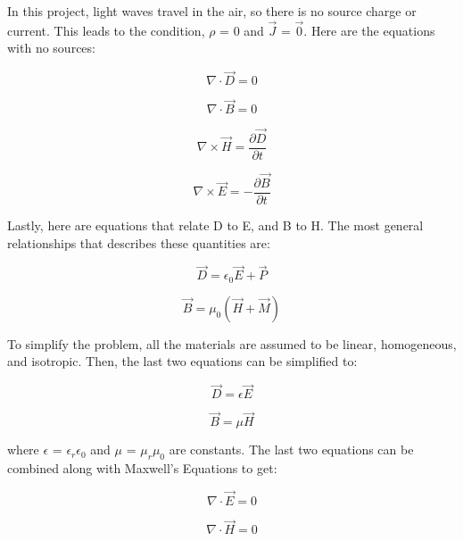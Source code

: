 \documentclass[12pt]{article}
\begin{document}
In this project, light waves travel in the air, so there is no source charge or current. This leads to the condition, \(\rho\) = 0 and \(\vec{J}\) = \(\vec{0}\). Here are the equations with no sources:

\begin{equation}
	\nabla \cdot \vec{D} = 0
\end{equation}

\begin{equation}
	\nabla \cdot \vec{B} = 0
\end{equation}

\begin{equation}
	\nabla \times \vec{H} = \frac{\partial \vec{D}}{\partial t}
\end{equation}

\begin{equation}
	\nabla \times \vec{E} = -\frac{\partial \vec{B}}{\partial t}
\end{equation}

Lastly, here are equations that relate D to E, and B to H. The most general relationships that describes these quantities are:

\begin{equation}
	\vec{D} = \epsilon_{0}\vec{E} + \vec{P}
\end{equation}

\begin{equation}
	\vec{B} = \mu_{0}(\vec{H} + \vec{M})
\end{equation}

To simplify the problem, all the materials are assumed to be linear, homogeneous, and isotropic. Then, the last two equations can be simplified to:

\begin{equation}
	\vec{D} = \epsilon\vec{E}
\end{equation}

\begin{equation}
	\vec{B} = \mu\vec{H}
\end{equation}

where \(\epsilon\) = \(\epsilon_{r}\)\(\epsilon_{0}\) and \(\mu\) = \(\mu_{r}\)\(\mu_{0}\) are constants. The last two equations can be combined along with Maxwell's Equations to get:

\begin{equation}
	\nabla \cdot \vec{E} = 0
\end{equation}

\begin{equation}
	\nabla \cdot \vec{H} = 0
\end{equation}
\end{document}
